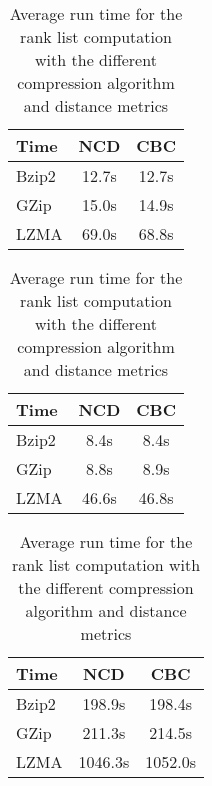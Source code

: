 \begin{table}
  \centering
  \caption{Average run time for the rank list computation with the different compression algorithm and distance metrics}
  \label{tab:compression_evaluation_times}

  \label{tab:compression_evaluation_time_oxquarry}
  \begin{tabular}{l c c}
    \toprule
    Time      & NCD   & CBC \\
    \midrule
    Bzip2     & 12.7s & 12.7s \\
    GZip      & 15.0s & 14.9s \\
    LZMA      & 69.0s & 68.8s \\
    \bottomrule
  \end{tabular}

  \vspace{0.5cm}

  \label{tab:compression_evaluation_time_brunet}
  \begin{tabular}{l c c}
    \toprule
    Time      & NCD   & CBC \\
    \midrule
    Bzip2     & 8.4s & 8.4s \\
    GZip      & 8.8s & 8.9s \\
    LZMA      & 46.6s & 46.8s \\
    \bottomrule
  \end{tabular}

  \vspace{0.5cm}

  \label{tab:compression_evaluation_time_st_jean}
  \begin{tabular}{l c c}
    \toprule
    Time      & NCD    & CBC \\
    \midrule
    Bzip2     & 198.9s  & 198.4s \\
    GZip      & 211.3s  & 214.5s \\
    LZMA      & 1046.3s & 1052.0s \\
    \bottomrule
  \end{tabular}
\end{table}
